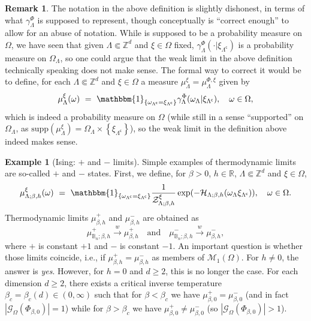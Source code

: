 \documentclass[12pt]{article}
\newcommand{\BBB}{\mathbb{B}}
\newcommand{\G}{\mathcal{G}}
\renewcommand{\H}{\mathcal{H}}
\newcommand{\M}{\mathcal{M}}
\newcommand{\R}{\mathbb{R}}
\newcommand{\Z}{\mathbb{Z}}
\newcommand{\ZZ}{\mathcal{Z}}
\newcommand{\set}[1]{\left\{#1\right\}}
\newcommand{\pika}{\boldsymbol{\cdot}}
\newcommand{\1}{\mathbbm{1}}
\renewcommand{\c}{\mathsf{c}}
\newcommand{\supp}{\mathrm{supp}}
\newcommand{\5}{\vspace{0.5cm}}
\theoremstyle{definition}
\newtheorem{ex}[thm]{Example}
\newtheorem{rem}[thm]{Remark}
\begin{document}
\begin{rem}
The notation in the above definition is slightly dishonest, in terms of what $\gamma_\Lambda^\Phi$ is supposed to represent, though conceptually is ``correct enough'' to allow for an abuse of notation. While is supposed to be a probability measure on $\Omega$, we have seen that given $\Lambda\Subset\Z^d$ and $\xi\in\Omega$ fixed, $\gamma_\Lambda^\Phi(\pika|\xi_{\Lambda^\c})$ is a probability measure on $\Omega_\Lambda$, so one could argue that the weak limit in the above definition technically speaking does not make sense. The formal way to correct it would be to define, for each $\Lambda\Subset\Z^d$ and $\xi\in\Omega$ a measure $\mu_\Lambda^\xi=\mu_\Lambda^{\Phi,\xi}$ given by
$$\mu_\Lambda^\xi(\omega) ~=~ \1_{\set{\omega_{\Lambda^\c}=\xi_{\Lambda^\c}}}\gamma_\Lambda^\Phi(\omega_\Lambda|\xi_{\Lambda^\c}), \quad \omega\in\Omega,$$
which is indeed a probability measure on $\Omega$ (while still in a sense ``supported'' on $\Omega_\Lambda$, as $\supp(\mu_\Lambda^\xi)=\Omega_\Lambda\times\set{\xi_{\Lambda^\c}}$), so the weak limit in the definition above indeed makes sense.
\end{rem}

\begin{ex}[Ising: $+$ and $-$ limits]
Simple examples of thermodynamic limits are so-called $+$ and $-$ states. First, we define, for $\beta>0$, $h\in\R$, $\Lambda\Subset\Z^d$ and $\xi\in\Omega$,
$$\mu_{\Lambda;\beta,h}^\xi(\omega) ~=~ \1_{\set{\omega_{\Lambda^\c}=\xi_{\Lambda^\c}}}\frac{1}{\ZZ_{\Lambda;\beta,h}^\xi}\exp(-\H_{\Lambda;\beta,h}(\omega_\Lambda\xi_{\Lambda^\c})), \quad \omega\in\Omega.$$
Thermodynamic limits $\mu_{\beta,h}^{+}$ and $\mu_{\beta,h}^{-}$ are obtained as 
$$\mu_{\BBB_n;\beta,h}^+\xrightarrow{w}\mu_{\beta,h}^+ \quad\text{and}\quad \mu_{\BBB_n;\beta,h}^-\xrightarrow{w}\mu_{\beta,h}^-,$$
where $+$ is constant $+1$ and $-$ is constant $-1$. An important question is whether those limits coincide, i.e., if $\mu_{\beta,h}^+=\mu_{\beta,h}^-$ as members of $\M_1(\Omega)$. For $h\neq 0$, the answer is \textit{yes}. However, for $h=0$ and $d\geq 2$, this is no longer the case. For each dimension $d\geq 2$, there exists a critical inverse temperature $\beta_c=\beta_c(d)\in(0,\infty)$ such that for $\beta<\beta_c$ we have $\mu_{\beta,0}^+=\mu_{\beta,0}^-$ (and in fact $|\G_\Omega(\Phi_{\beta,0})|=1$) while for $\beta>\beta_c$ we have $\mu_{\beta,0}^+\neq\mu_{\beta,0}^-$ (so $|\G_{\Omega}(\Phi_{\beta,0})|>1$).
\end{ex}
\end{document}
